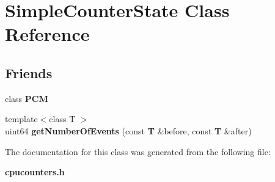 \section{Simple\+Counter\+State Class Reference}
\label{classSimpleCounterState}
\subsection*{Friends}
\begin{DoxyCompactItemize}
\item 
\mbox{\label{classSimpleCounterState_ab5f56d2e95ba3daf52c17b8a1d356d64}} 
class {\bfseries P\+CM}
\item 
\mbox{\label{classSimpleCounterState_a1eaf6125d8827e066565b4958a3725c9}} 
{\footnotesize template$<$class T $>$ }\\uint64 {\bfseries get\+Number\+Of\+Events} (const \textbf{ T} \&before, const \textbf{ T} \&after)
\end{DoxyCompactItemize}


The documentation for this class was generated from the following file\+:\begin{DoxyCompactItemize}
\item 
\textbf{ cpucounters.\+h}\end{DoxyCompactItemize}
